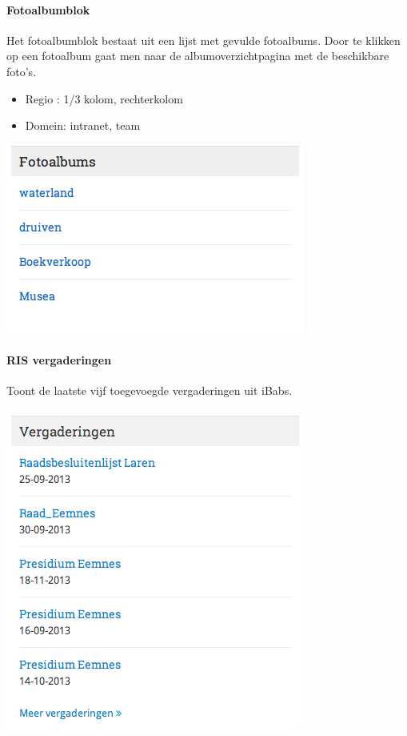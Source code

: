 \paragraph{Fotoalbumblok}\label{fotoalbumblok}

Het fotoalbumblok bestaat uit een lijst met gevulde fotoalbums. Door te klikken op een fotoalbum gaat men naar de albumoverzichtpagina met de beschikbare foto's.

\begin{itemize}
\item Regio : 1/3 kolom, rechterkolom
\item Domein: intranet, team
\end{itemize}

\begin{center}
	\includegraphics[scale=0.5]{img/blokken/fotoalbum.png}
\end{center}

\paragraph{RIS vergaderingen}

Toont de laatste vijf toegevoegde vergaderingen uit iBabs.

\begin{center}
	\includegraphics[scale=0.5]{img/blokken/ibabs1.png}
\end{center}

